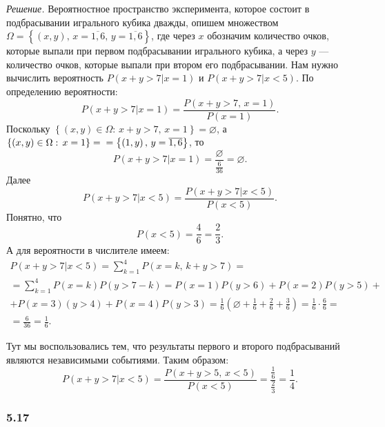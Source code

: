 \textit{Решение.}
Вероятностное пространство эксперимента,
которое состоит в подбрасывании игрального кубика дважды,
опишем множеством
$ \Omega =
\left\{ \left( x, y \right), \, x = \overline{1, 6}, \, y = \overline{1, 6} \right\} $,
где через $x$ обозначим количество очков,
которые выпали при первом подбрасывании игрального кубика, а через $y$ --- количество очков, которые выпали при втором его подбрасывании.
Нам нужно вычислить вероятность $P \left( \left. x+y>7 \right| x=1 \right) $ и $P \left( \left. x+y>7 \right| x<5 \right) $.
По определению вероятности:
$$P \left( \left. x+y>7 \right| x=1 \right) =
\frac{P \left( x+y>7, \, x=1 \right) }{P \left( x=1 \right) }.$$
Поскольку
$ \left\{ \left( x, y \right) \in \Omega: \, x + y > 7, \, x = 1 \right\} =
\varnothing $,
а $ \left\{ \left( x, y \right) \in \Omega: \, x = 1 \right\} =  \\ = \left\{ \left( 1, y \right), \, y = \overline{1, 6} \right\} $, то
$$P \left( \left. x+y>7 \right| x=1 \right) =
\frac{ \varnothing }{ \frac{6}{36} } =
\varnothing.$$
Далее
$$P \left( \left. x+y>7 \right| x<5 \right) =
\frac{P \left( \left. x+y>7 \right| x<5 \right) }{P \left( x<5 \right) }.$$
Понятно, что
$$P \left( x<5 \right) =
\frac{4}{6} =
\frac{2}{3}.$$
А для вероятности в числителе имеем:
\begin{equation*}
\begin{split}
P \left( \left. x+y>7 \right| x<5 \right) =
\sum \limits_{k=1}^4 P \left(x=k, \, k+y>7 \right) = \\
= \sum \limits_{k=1}^4 P \left( x=k \right) P \left( y>7-k \right) =
P \left( x=1 \right) P \left( y>6 \right) +
P \left( x=2 \right) P \left( y>5 \right) + \\
+ P \left( x=3 \right) \left( y>4 \right) +
P \left( x=4 \right) P \left( y>3 \right) =
\frac{1}{6} \left(\varnothing +\frac{1}{6} + \frac{2}{6} + \frac{3}{6} \right) =
\frac{1}{6} \cdot \frac{6}{6} = \\
= \frac{6}{36} =
\frac{1}{6}.
\end{split}
\end{equation*}

Тут мы воспользовались тем, что результаты первого и второго подбрасываний являются независимыми событиями.
Таким образом:
$$P \left( \left. x+y>7 \right| x<5 \right) =
\frac{P \left( x+y>5, \, x<5 \right) }{P \left( x<5 \right) } =
\frac{ \frac{1}{6} }{ \frac{2}{3} } =
\frac{1}{4}.$$

\subsubsection*{5.17}

